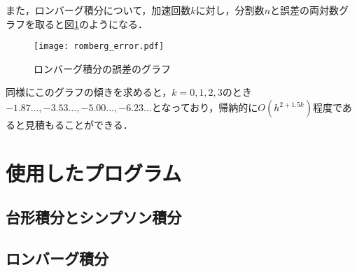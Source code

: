 \documentclass[a4paper]{bxjsarticle}
\begin{document}
	また，ロンバーグ積分について，加速回数$k$に対し，分割数$n$と誤差の両対数グラフを取ると図\ref{fig:romberg_error}のようになる．

	\begin{figure}[bt]
		\begin{center}
			\texttt{[image: romberg\_error.pdf]}
		\end{center}
		\caption{ロンバーグ積分の誤差のグラフ}
		\label{fig:romberg_error}
	\end{figure}

	同様にこのグラフの傾きを求めると，$k=0,1,2,3$のとき$-1.87\dots, -3.53\dots, -5.00\dots, -6.23\dots$となっており，帰納的に$O(h^{2+1.5k})$程度であると見積もることができる．


	\appendix
	\section{使用したプログラム} \label{sec:program}
	\subsection{台形積分とシンプソン積分}

	\subsection{ロンバーグ積分}
\end{document}

